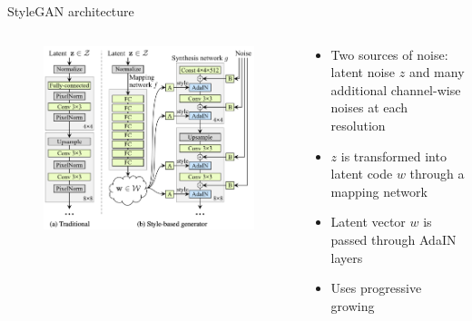 \documentclass[handout, 10pt]{beamer}
\begin{document}
\begin{frame}{StyleGAN architecture}
\begin{columns}
 \begin{column}{.49\textwidth}
    \begin{figure}
        \centering
        \includegraphics[width=\textwidth]{images/stylegan-architecture}
    \end{figure}
 \end{column}

\begin{column}{.49\textwidth}
\begin{itemize}
    \small
    \item\pause Two sources of noise: latent noise $z$ and many additional channel-wise noises at each resolution
    \item\pause $z$ is transformed into latent code $w$ through a mapping network
    \item\pause Latent vector $w$ is passed through AdaIN layers
    \item\pause Uses progressive growing
\end{itemize}
 \end{column}
\end{columns}
\end{frame}
\end{document}
